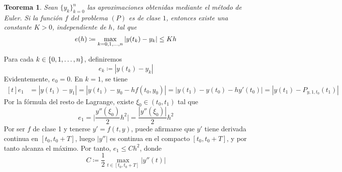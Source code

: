 \documentclass[11pt]{report}
\makeatletter
\renewenvironment{proof}[1][\proofname]{\par
  \pushQED{\qed}%
  \normalfont \topsep\z@skip %
  \trivlist
  \item[\hskip\labelsep
        \itshape
    #1\@addpunct{.}]\ignorespaces
}{%
  \popQED\endtrivlist\@endpefalse
}
\theoremstyle{mytheorem}
\newtheorem{theorem}{Teorema}
\theoremstyle{mydefinition}
\theoremstyle{myexample}
\let\oldproofname=\proofname
\renewcommand{\proofname}{\rm\bf{\oldproofname}}}
\newenvironment{ctheorem} %
  {\begin{mdframed}[
        linewidth=3pt,
        linecolor=c2,
        bottomline=false,
        topline=false,
        rightline=false,
        innerrightmargin=0pt,
        innertopmargin=0pt,
        innerbottommargin=0pt,
        innerleftmargin=1em, %
        skipabove=\baselineskip]
    \begin{theorem}}
  {\end{theorem}\end{mdframed}}
\makeatother
\begin{document}
\begin{ctheorem}
Sean $\{y_k\}_{k=0}^n$ las aproximaciones obtenidas mediante el método de Euler. Si la función $f$ del problema $(P)$ es de clase $1$, entonces existe una constante $K>0$, independiente de $h$, tal que
\[e(h) \coloneqq \max_{k=0,1,\mathellipsis,n}|y(t_k)-y_k| \leq Kh\]
\end{ctheorem}

\begin{proof}
Para cada $k \in \{0,1,\mathellipsis,n\}$, definiremos
\[e_k \coloneqq |y(t_k)-y_k|\]
Evidentemente, $e_0 = 0$. En $k = 1$, se tiene
\[
\begin{aligned}[t]
e_1 &= |y(t_1)-y_1| = |y(t_1)-y_0-hf(t_0,y_0)| = |y(t_1)-y(t_0)-hy'(t_0)| = |y(t_1)-P_{y,1,t_0}(t_1)|
\end{aligned}
\]
Por la fórmula del resto de Lagrange, existe $\xi_0 \in (t_0,t_1)$ tal que
\[e_1 = \biggl|\frac{y''(\xi_0)}{2}h^2\biggr| = \frac{|y''(\xi_0)|}{2}h^2\]
Por ser $f$ de clase 1 y tenerse $y'=f(t,y)$, puede afirmarse que $y'$ tiene derivada continua en $[t_0,t_0+T]$, luego $|y''|$ es continua en el compacto $[t_0,t_0+T]$, y por tanto alcanza el máximo. Por tanto, $e_1 \leq Ch^2$, donde
\[C \coloneqq \frac{1}{2}\max_{t \in [t_0,t_0+T]} |y''(t)|\]


\end{proof}
\end{document}

